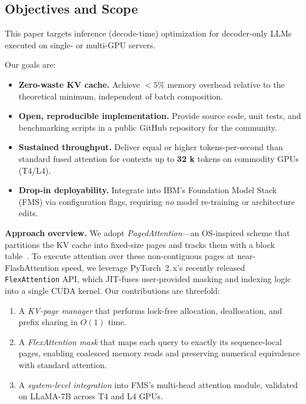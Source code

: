 \documentclass[conference]{IEEEtran}
\begin{document}
\subsection{Objectives and Scope}
This paper targets inference (decode-time) optimization for decoder-only LLMs executed on single- or multi-GPU servers.

Our goals are:

\begin{itemize}[leftmargin=*]
    \item \textbf{Zero-waste KV cache.}  Achieve $<\!5\%$ memory overhead relative to the theoretical minimum, independent of batch composition.
    \item \textbf{Open, reproducible implementation.}  Provide source code, unit tests, and benchmarking scripts in a public GitHub repository for the community.
    \item \textbf{Sustained throughput.}  Deliver equal or higher tokens-per-second than standard fused attention for contexts up to \textbf{32 k} tokens on commodity GPUs (T4/L4).
    \item \textbf{Drop‑in deployability.}  Integrate into IBM's Foundation Model Stack (FMS) via configuration flags, requiring \emph{no} model re‑training or architecture edits.
\end{itemize}

\vspace{0.5em}
\noindent\textbf{Approach overview.}
We adopt \emph{PagedAttention}—an OS-inspired scheme that partitions the KV cache into fixed-size pages and tracks them with a block table~\cite{kwon2023pagedattention}.  To execute attention over these non-contiguous pages at near-FlashAttention speed, we leverage PyTorch~2.\,x's recently released \texttt{FlexAttention} API, which JIT-fuses user-provided masking and indexing logic into a single CUDA kernel.  Our contributions are threefold:

\begin{enumerate}
    \item A \emph{KV-page manager} that performs lock-free allocation, deallocation, and prefix sharing in $O(1)$ time.
    \item A \emph{FlexAttention mask} that maps each query to exactly its sequence-local pages, enabling coalesced memory reads and preserving numerical equivalence with standard attention.
    \item A \emph{system-level integration} into FMS's multi-head attention module, validated on LLaMA-7B across T4 and L4 GPUs.
\end{enumerate}
\end{document}
